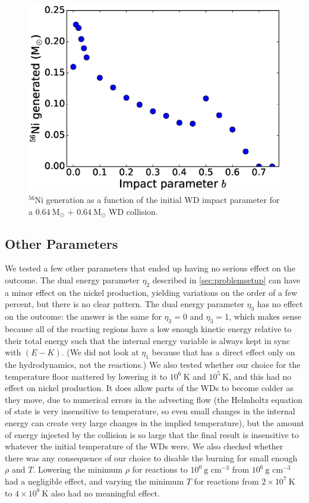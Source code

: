 \documentclass[twocolumn,numberedappendix]{../aastex6}
\newcommand{\msolar}{\mathrm{M}_\odot}
\begin{document}
\begin{figure}
  \centering
  \includegraphics[scale=0.425]{plots/impact_parameter}
  \caption[Nickel production dependence on the impact parameter]
          {$^{56}$Ni generation as a function of the initial WD impact parameter for
           a $0.64\ \msolar$ + $0.64\ \msolar$ WD collision.
           \label{fig:impact_parameter}}
\end{figure}


\subsection{Other Parameters}

We tested a few other parameters that ended up having no serious effect on the outcome.
The dual energy parameter $\eta_2$ described in \autoref{sec:problemsetup} can have a
minor effect on the nickel production, yielding variations on the order of a few percent,
but there is no clear pattern. The dual energy parameter $\eta_3$ has no effect on the
outcome: the answer is the same for $\eta_3 = 0$ and $\eta_3 = 1$, which makes sense
because all of the reacting regions have a low enough kinetic energy relative to their
total energy such that the internal energy variable is always kept in sync with $(E - K)$.
(We did not look at $\eta_1$ because that has a direct effect only on the hydrodynamics,
not the reactions.) We also tested whether our choice for the temperature floor mattered
by lowering it to $10^6\ \text{K}$ and $10^5\ \text{K}$, and this had no effect on nickel
production. It does allow parts of the WDs to become colder as they move, due to numerical
errors in the advecting flow (the Helmholtz equation of state is very insensitive to
temperature, so even small changes in the internal energy can create very large changes
in the implied temperature), but the amount of energy injected by the collision is so
large that the final result is insensitive to whatever the initial temperature of the
WDs were. We also checked whether there was any consequence of our choice to disable the
burning for small enough $\rho$ and $T$. Lowering the minimum $\rho$ for reactions to
$10^0\ \text{g cm}^{-3}$ from $10^6\ \text{g cm}^{-3}$ had a negligible effect,
and varying the minimum $T$ for reactions from $2 \times 10^{7}\ \text{K}$ to
$4 \times 10^{8}\ \text{K}$ also had no meaningful effect.
\end{document}
